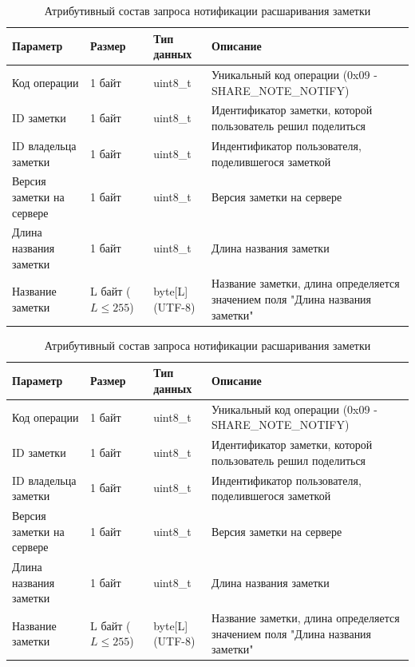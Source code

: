 \begin{table}[H]
    \centering
    \caption{Атрибутивный состав запроса нотификации расшаривания заметки}
    \begin{tabular}{|p{4cm}|p{2cm}|p{3cm}|p{6cm}|}
    \hline
    \textbf{Параметр} & \textbf{Размер} & \textbf{Тип данных} & \textbf{Описание} \\ \hline
    Код операции & 1 байт & uint8\_t & Уникальный код операции (0x09 - SHARE\_NOTE\_NOTIFY) \\ \hline
    ID заметки & 1 байт & uint8\_t & Идентификатор заметки, которой пользователь решил поделиться \\ \hline
    ID владельца заметки & 1 байт & uint8\_t & Индентификатор пользователя, поделившегося заметкой \\ \hline
    Версия заметки на сервере & 1 байт & uint8\_t & Версия заметки на сервере \\ \hline
    Длина названия заметки & 1 байт & uint8\_t & Длина названия заметки \\ \hline
    Название заметки & L байт (\(L \le 255\)) & byte[L] (UTF-8) & Название заметки, длина определяется значением поля "Длина названия заметки" \\ \hline
    \end{tabular}
    \label{tab:note_create_request}
\end{table}





\begin{table}[H]
    \centering
    \caption{Атрибутивный состав запроса нотификации расшаривания заметки}
    \begin{tabular}{|p{4cm}|p{2cm}|p{3cm}|p{6cm}|}
    \hline
    \textbf{Параметр} & \textbf{Размер} & \textbf{Тип данных} & \textbf{Описание} \\ \hline
    Код операции & 1 байт & uint8\_t & Уникальный код операции (0x09 - SHARE\_NOTE\_NOTIFY) \\ \hline
    ID заметки & 1 байт & uint8\_t & Идентификатор заметки, которой пользователь решил поделиться \\ \hline
    ID владельца заметки & 1 байт & uint8\_t & Индентификатор пользователя, поделившегося заметкой \\ \hline
    Версия заметки на сервере & 1 байт & uint8\_t & Версия заметки на сервере \\ \hline
    Длина названия заметки & 1 байт & uint8\_t & Длина названия заметки \\ \hline
    Название заметки & L байт (\(L \le 255\)) & byte[L] (UTF-8) & Название заметки, длина определяется значением поля "Длина названия заметки" \\ \hline
    \end{tabular}
    \label{tab:note_create_request}
\end{table}





